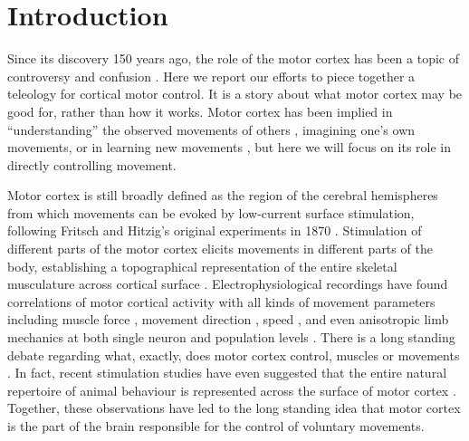 \section{Introduction}

Since its discovery 150 years ago, the role of the motor cortex has been a topic of controversy and confusion \cite{Lashley1924}. Here we report our efforts to piece together a teleology for cortical motor control. It is a story about what motor cortex may be good for, rather than how it works. Motor cortex has been implied in ``understanding'' the observed movements of others \cite{Rizzolatti2004}, imagining one's own movements, or in learning new movements \cite{Kawai2015}, but here we will focus on its role in directly controlling movement.

Motor cortex is still broadly defined as the region of the cerebral hemispheres from which movements can be evoked by low-current surface stimulation, following Fritsch and Hitzig's original experiments in 1870 \cite{Fritsch1870}. Stimulation of different parts of the motor cortex elicits movements in different parts of the body, establishing a topographical representation of the entire skeletal musculature across cortical surface \cite{Leyton1917,Penfield1937,Neafsey1986}. Electrophysiological recordings have found correlations of motor cortical activity with all kinds of movement parameters including muscle force \cite{Evarts1968}, movement direction \cite{Georgopoulos1986}, speed \cite{Schwartz1993} , and even anisotropic limb mechanics \cite{Scott2001} at both single neuron \cite{Evarts1968,Churchland2007} and population levels \cite{Georgopoulos1986,Churchland2012}. There is a long standing debate regarding what, exactly, does motor cortex control, muscles or movements \cite{Todorov2000}. In fact, recent stimulation studies have even suggested that the entire natural repertoire of animal behaviour is represented across the surface of motor cortex \cite{Graziano2002,Aflalo2006}. Together, these observations have led to the long standing idea that motor cortex is the part of the brain responsible for the control of voluntary movements.

